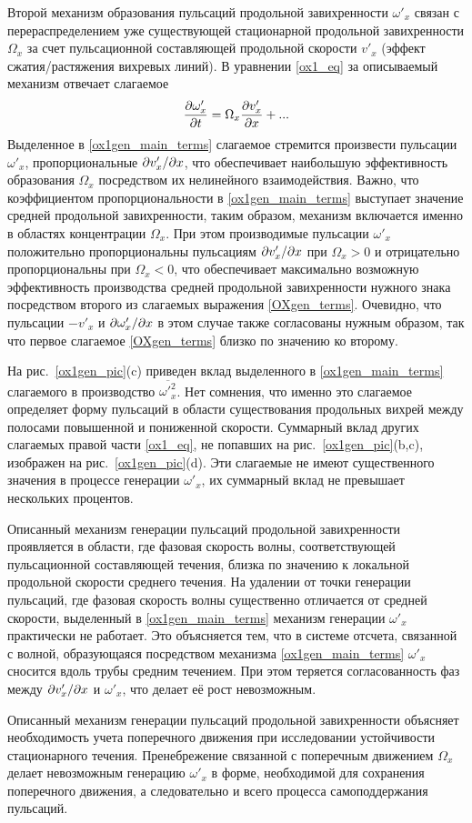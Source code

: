 Второй механизм образования пульсаций продольной завихренности $\omega'_x$ связан с перераспределением уже существующей стационарной продольной завихренности $\Omega_x$ за счет пульсационной составляющей продольной скорости $v'_x$ (эффект сжатия/растяжения вихревых линий). В уравнении \eqref{ox1_eq} за описываемый механизм отвечает слагаемое
\begin{equation}\label{ox1gen_main_terms}
\frac{\partial \omega'_x}{\partial t} = \Omega_x \frac {\partial v'_x}{\partial x} + ...
\end{equation}
Выделенное в \eqref{ox1gen_main_terms} слагаемое стремится произвести пульсации $\omega'_x$, пропорциональные $\partial v'_x / \partial x$, что обеспечивает наибольшую эффективность образования $\Omega_x$ посредством их нелинейного взаимодействия. Важно, что коэффициентом пропорциональности в \eqref{ox1gen_main_terms} выступает значение средней продольной завихренности, таким образом, механизм включается именно в областях концентрации $\Omega_x$. При этом производимые пульсации $\omega'_x$ положительно пропорциональны пульсациям  $\partial v'_x / \partial x$ при $\Omega_x>0$ и отрицательно пропорциональны при $\Omega_x<0$, что обеспечивает максимально возможную эффективность производства средней продольной завихренности нужного знака посредством второго из слагаемых выражения \eqref{OXgen_terms}. Очевидно, что пульсации $-v'_x$ и $\partial \omega'_x / \partial x$ в этом случае также согласованы нужным образом, так что первое слагаемое \eqref{OXgen_terms} близко по значению ко второму.


На рис.~\ref{ox1gen_pic}(c) приведен вклад выделенного в \eqref{ox1gen_main_terms} слагаемого в производство $\overline{\omega'^2_x}$. Нет сомнения, что именно это слагаемое определяет форму пульсаций в области существования продольных вихрей между полосами повышенной и пониженной скорости. Суммарный вклад других слагаемых правой части \eqref{ox1_eq}, не попавших на рис.~\ref{ox1gen_pic}(b,c), изображен на рис.~\ref{ox1gen_pic}(d). Эти слагаемые не имеют существенного значения в процессе генерации $\omega'_x$, их суммарный вклад не превышает нескольких процентов.

Описанный механизм генерации пульсаций продольной завихренности проявляется в области, где фазовая скорость волны, соответствующей пульсационной составляющей течения, близка по значению к локальной продольной скорости среднего течения. На удалении от точки генерации пульсаций, где фазовая скорость волны существенно отличается от средней скорости, выделенный в \eqref{ox1gen_main_terms} механизм генерации $\omega'_x$ практически не работает. Это объясняется тем, что в системе отсчета, связанной с волной, образующаяся посредством механизма \eqref{ox1gen_main_terms} $\omega'_x$ сносится вдоль трубы средним течением. При этом теряется согласованность фаз между $\partial v'_x / \partial x$ и $\omega'_x$, что делает её рост невозможным.


Описанный механизм генерации пульсаций продольной завихренности объясняет необходимость учета поперечного движения при исследовании устойчивости стационарного течения. Пренебрежение связанной с поперечным движением $\Omega_x$ делает невозможным генерацию $\omega'_x$ в форме, необходимой для сохранения поперечного движения, а следовательно и всего процесса самоподдержания пульсаций.

